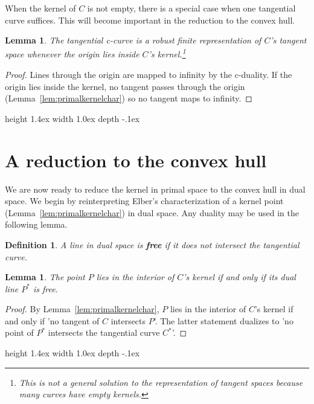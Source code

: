 \documentclass{sig-alternate}
\newcommand{\QED}{\vrule height 1.4ex width 1.0ex depth -.1ex\ \vspace{.3in}} %
\newcommand{\prf}{\noindent{{\bf Proof}:\ \ \ }}
\newtheorem{lemma}[theorem]{Lemma}
\newtheorem{defn2}[theorem]{Definition}
\begin{document}
When the kernel of $C$ is not empty, there is a special case
when one tangential curve suffices.
This will become important in the reduction to the convex hull.


\begin{lemma}
\label{lem:crobust}
The tangential c-curve is a robust finite representation of $C$'s tangent space
whenever the origin lies inside $C$'s kernel.\footnote{This 
	is not a general solution to the representation of tangent spaces
	because many curves have empty kernels.}
\end{lemma}
\ifACM
\begin{proof}
\else
\prf
\fi
Lines through the origin are mapped to infinity by the c-duality.
If the origin lies inside the kernel,
no tangent passes through the origin (Lemma~\ref{lem:primalkernelchar})
so no tangent maps to infinity.
\ifACM
\end{proof}
\else
\QED
\fi


\section{A reduction to the convex hull}
\label{sec:reduction}

We are now ready to reduce the kernel in primal space to the convex hull in dual space.
We begin by reinterpreting Elber's characterization of a kernel point 
(Lemma~\ref{lem:primalkernelchar}) in dual space.
Any duality may be used in the following lemma.

\begin{defn2}
A line in dual space is {\bf free} if it does not intersect the tangential curve.
\end{defn2}

\begin{lemma}
\label{lem:dualkernelchar}
The point $P$ lies in the interior of $C$'s kernel if and only if 
its dual line $P^*$ is free.
\end{lemma}
\ifACM
\begin{proof}
\else
\prf
\fi
By Lemma~\ref{lem:primalkernelchar},
$P$ lies in the interior of $C$'s kernel if and only if 
'no tangent of $C$ intersects $P$'.
The latter statement dualizes to 'no point of $P^*$ intersects the tangential curve $C^*$'.
\ifACM
\end{proof}
\else
\QED
\fi
\end{document}
